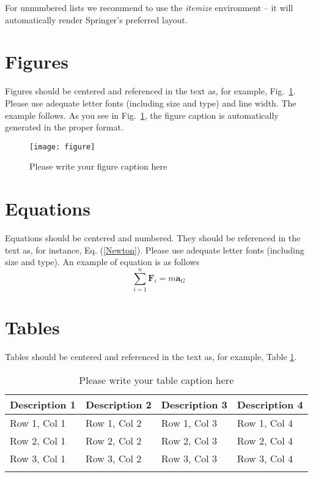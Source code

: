 \documentclass{svmult}
\begin{document}
For unnumbered lists we recommend to use the \textit{itemize} environment -- it will automatically render Springer's preferred layout.

\section{Figures}

Figures should be centered and referenced in the text as, for example, Fig.~\ref{gear}. Please use adequate letter fonts (including size and type) and line width. The example follows. As you see in Fig.~\ref{gear}, the figure caption is automatically generated in the proper format.

\begin{figure}
\center
\texttt{[image: figure]}
\caption{Please write your figure caption here}\label{gear}
\end{figure}

\section{Equations}

Equations should be centered and numbered. They should be referenced in the text as, for instance, Eq. (\ref{Newton}). Please use adequate letter fonts (including size and type). An example of equation is as follows
\begin{equation}\label{Newton}
\sum\limits_{i = 1}^n {{\mathbf{F}}_{i} }  = m \mathbf{a}_G
\end{equation}


\section{Tables}

Tables should be centered and referenced in the text as, for
example, Table \ref{tri}.

\begin{table}
\caption{Please write your table caption here}
\label{tri}
\centering
\begin{tabular}{p{2cm}p{2.4cm}p{2cm}p{2.4cm}}
\svhline\noalign{\smallskip}
Description 1 & Description 2 & Description 3 & Description 4  \\
\hline\noalign{\smallskip}
Row 1, Col 1 & Row 1, Col 2  & Row 1, Col 3 & Row 1, Col 4\\
Row 2, Col 1 & Row 2, Col 2  & Row 2, Col 3 & Row 2, Col 4\\
Row 3, Col 1 & Row 3, Col 2  & Row 3, Col 3 & Row 3, Col 4\\
\svhline\noalign{\smallskip}
\end{tabular}
\end{table}
\end{document}
